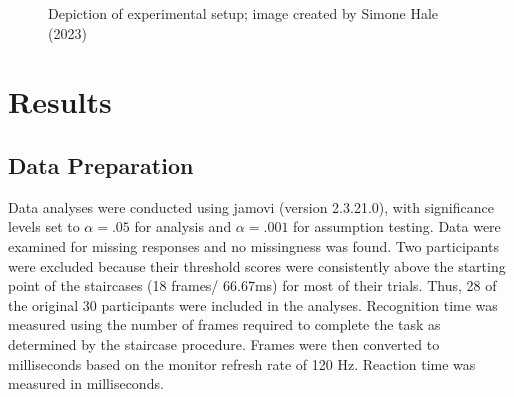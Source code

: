 \documentclass[
  authoryear,
  review,
  3p,
  onecolumn]{elsarticle}
\begin{document}
\begin{figure}


\caption{\label{fig-setup}Depiction of experimental setup; image created
by Simone Hale (2023)}

\end{figure}%

\section{Results}\label{results}

\subsection{Data Preparation}\label{data-preparation}

Data analyses were conducted using jamovi (version 2.3.21.0), with
significance levels set to \(\alpha = .05\) for analysis and
\(\alpha = .001\) for assumption testing. Data were examined for missing
responses and no missingness was found. Two participants were excluded
because their threshold scores were consistently above the starting
point of the staircases (18 frames/ 66.67ms) for most of their trials.
Thus, 28 of the original 30 participants were included in the analyses.
Recognition time was measured using the number of frames required to
complete the task as determined by the staircase procedure. Frames were
then converted to milliseconds based on the monitor refresh rate of 120
Hz. Reaction time was measured in milliseconds.
\end{document}
